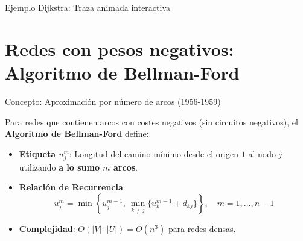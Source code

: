 \documentclass[
  ignorenonframetext,
]{beamer}
\providecommand{\tightlist}{%
  \setlength{\itemsep}{0pt}\setlength{\parskip}{0pt}}
\begin{document}
\begin{frame}{Ejemplo Dijkstra: Traza animada interactiva}
\label{ejemplo-dijkstra-traza-animada-interactiva}
\end{frame}

\section{Redes con pesos negativos: Algoritmo de
Bellman-Ford}\label{redes-con-pesos-negativos-algoritmo-de-bellman-ford}

\begin{frame}{Concepto: Aproximación por número de arcos (1956-1959)}
\label{concepto-aproximaciuxf3n-por-nuxfamero-de-arcos-1956-1959}
\begin{tcolorbox}[enhanced jigsaw, colframe=quarto-callout-note-color-frame, toptitle=1mm, colback=white, colbacktitle=quarto-callout-note-color!10!white, titlerule=0mm, breakable, coltitle=black, opacityback=0, bottomrule=.15mm, title=\textcolor{quarto-callout-note-color}{\faInfo}\hspace{0.5em}{Aproximación iterativa por longitud de arcos}, rightrule=.15mm, arc=.35mm, leftrule=.75mm, left=2mm, toprule=.15mm, bottomtitle=1mm, opacitybacktitle=0.6]

Para redes que contienen arcos con costes negativos (sin circuitos
negativos), el \textbf{Algoritmo de Bellman-Ford} define:

\begin{itemize}
\item
  \textbf{Etiqueta \(u_j^m\)}: Longitud del camino mínimo desde el
  origen \(1\) al nodo \(j\) utilizando \textbf{a lo sumo \(m\) arcos}.
\item
  \textbf{Relación de Recurrencia}:
  \[u_j^m = \min \left\{ u_j^{m-1}, \ \min_{k \neq j} \{ u_k^{m-1} + d_{kj} \} \right\}, \quad m = 1, \dots, n-1\]
\end{itemize}

\end{tcolorbox}

\begin{itemize}
\tightlist
\item
  \textbf{Complejidad}: \(O(|V| \cdot |U|) = O(n^3)\) para redes densas.
\end{itemize}
\end{frame}
\end{document}
